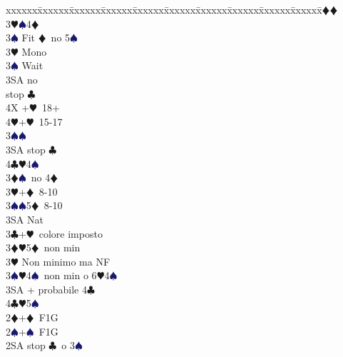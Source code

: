 \documentclass[a4paper,italian]{article}
\newcommand{\BC}{\textcolor{OliveGreen}{$\clubsuit$}}
\newcommand{\BD}{\textcolor{RedOrange}{$\vardiamondsuit$}}
\newcommand{\BH}{\textcolor{Red2}{$\varheartsuit${}}}
\newcommand{\BS}{\textcolor{MidnightBlue}{$\spadesuit${}}}
\newenvironment{bidtable}
{\begin{tabbing}

    xxxxxx\=xxxxxx\=xxxxxx\=xxxxxx\=xxxxxx\=xxxxxx\=xxxxxx\=xxxxxx\=xxxxxx\=xxxxxx\=\kill}
{\end{tabbing} }%
\begin{document}
\begin{multicols}{2}
\begin{bidtable}
                                            3\BD {}\BD \+\\
                                            3\BH {}\BS 4\BD \\
                                            3\BS \> Fit \BD\ no 5\BS \-\\
                                            3\BH \> Mono\+\\
                                            3\BS \> Wait\+\\
                                            3SA  no\+\\ stop \BC \-\\
                                            4X +\BH\ 18+\\
                                            4\BH {}+\BH\ 15-17\-\-\\
                                            3\BS {}\BS \\
                                            3SA  stop \BC \\
                                            4\BC {}\BH 4\BS \-\\
                                            3\BD {}\BS\ no 4\BD \\
                                            3\BH {}+\BD\ 8-10\\
                                            3\BS {}\BS 5\BD\ 8-10\\
                                            3SA \> Nat\-\\
                                            3\BC {}+\BH\ colore imposto\\
                                            3\BD {}\BH 5\BD\ non min\\
                                            3\BH \> Non minimo ma NF\\
                                            3\BS {}\BH 4\BS\ non min o 6\BH 4\BS \\
                                            3SA + probabile 4\BC \\
                                            4\BC {}\BH 5\BS \-\\
                                            2\BD {}+\BD\ F1G\\
                                            2\BS {}+\BS\ F1G\+\\
                                            2SA  stop \BC\ o 3\BS \+\\

\end{bidtable}
\end{multicols}
\end{document}
